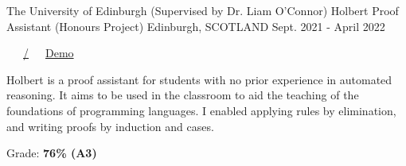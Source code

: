 \begin{cventries}
  \cventry
    {The University of Edinburgh (Supervised by Dr. Liam O'Connor)} %
    {Holbert Proof Assistant (Honours Project)} %
    {Edinburgh, SCOTLAND} %
    {Sept. 2021 - April 2022} %
    {
      \color{awesome}  \color{graytext}\ \ \ \href{https://github.com/chrisjpm/holbert}{\faGithub\acvHeaderIconSep\@chrisjpm/\@holbert}\ \ \ \href{http://liamoc.net/holbert}{\faGlobe\acvHeaderIconSep\@Holbert Demo}\ \ \ \href{https://github.com/chrisjpm/holbert/blob/master/report.pdf}{\faFile*[regular]\acvHeaderIconSep\@Thesis}
      \vspace{1.6em}
      \begin{cvitems} %
        \item Holbert is a proof assistant for students with no prior experience in automated reasoning. It aims to be used in the classroom to aid the teaching of the foundations of programming languages. I enabled applying rules by elimination, and writing proofs by induction and cases.
        \item Grade: \textbf{76\% (A3)}
      \end{cvitems}
    }
    


\end{cventries}

